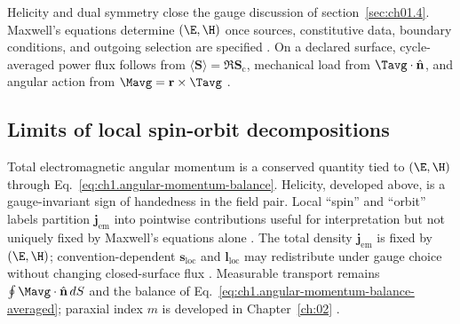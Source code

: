 Helicity and dual symmetry close the gauge discussion of section~\ref{sec:ch01.4}. Maxwell's equations determine $(\E,\H)$ once sources, constitutive data, boundary conditions, and outgoing selection are specified \cite{maxwell1873,stratton1941}. On a declared surface, cycle-averaged power flux follows from $\langle\mathbf{S}\rangle=\Re\mathbf{S}_\mathrm{c}$, mechanical load from $\Tavg\cdot\hat{\mathbf{n}}$, and angular action from $\Mavg=\mathbf{r}\times\Tavg$ \cite{poynting1884,beth1936}.

\label{sec:ch01.4.4}
\subsection{Limits of local spin-orbit decompositions}
\label{sec:ch01.4.5}

Total electromagnetic angular momentum is a conserved quantity tied to $(\E,\H)$ through Eq.~\eqref{eq:ch1.angular-momentum-balance}. Helicity, developed above, is a gauge-invariant sign of handedness in the field pair. Local ``spin'' and ``orbit'' labels partition $\mathbf{j}_{\mathrm{em}}$ into pointwise contributions useful for interpretation but not uniquely fixed by Maxwell's equations alone \cite{belinfante1940,stratton1941}. The total density $\mathbf{j}_{\mathrm{em}}$ is fixed by $(\E,\H)$; convention-dependent $\mathbf{s}_{\mathrm{loc}}$ and $\mathbf{l}_{\mathrm{loc}}$ may redistribute under gauge choice without changing closed-surface flux \cite{belinfante1940,stratton1941}. Measurable transport remains $\oint \Mavg\cdot\hat{\mathbf{n}}\,dS$ and the balance of Eq.~\eqref{eq:ch1.angular-momentum-balance-averaged}; paraxial index $m$ is developed in Chapter~\ref{ch:02} \cite{allen1992}.


